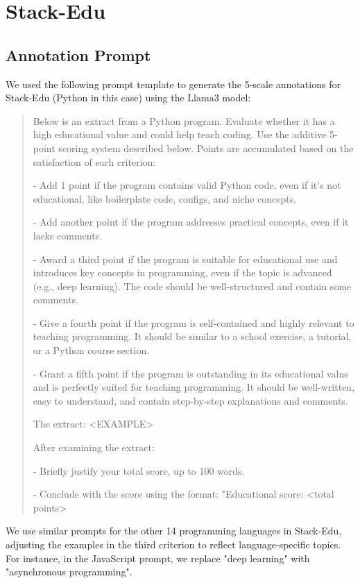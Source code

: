 \documentclass{article}
\theoremstyle{plain}
\theoremstyle{definition}
\theoremstyle{remark}
\begin{document}
\clearpage
\section{Stack-Edu}
\label{app:stack-edu}

\subsection{Annotation Prompt}\label{app:stack-edu-prompt}

We used the following prompt template to generate the 5-scale annotations for Stack-Edu (Python in this case) using the Llama3 model:

\begin{quote}
\footnotesize
Below is an extract from a Python program. Evaluate whether it has a high educational value and could help teach coding. Use the additive 5-point scoring system described below. Points are accumulated based on the satisfaction of each criterion:

- Add 1 point if the program contains valid Python code, even if it's not educational, like boilerplate code, configs, and niche concepts.

- Add another point if the program addresses practical concepts, even if it lacks comments.

- Award a third point if the program is suitable for educational use and introduces key concepts in programming, even if the topic is advanced (e.g., deep learning). The code should be well-structured and contain some comments. 

- Give a fourth point if the program is self-contained and highly relevant to teaching programming. It should be similar to a school exercise, a tutorial, or a Python course section.

- Grant a fifth point if the program is outstanding in its educational value and is perfectly suited for teaching programming. It should be well-written, easy to understand, and contain step-by-step explanations and comments.

The extract:
<EXAMPLE>

After examining the extract: 

- Briefly justify your total score, up to 100 words.

- Conclude with the score using the format: "Educational score:  <total points>
\end{quote}
We use similar prompts for the other 14 programming languages in Stack-Edu, adjusting the examples in the third criterion to reflect language-specific topics. For instance, in the JavaScript prompt, we replace "deep learning" with "asynchronous programming".
\end{document}
